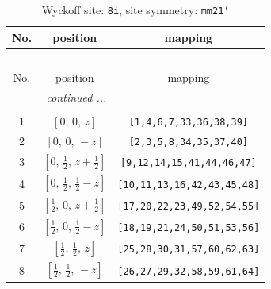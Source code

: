 \documentclass[fleqn,8pt]{jsarticle}
\begin{document}
\begin{longtable}{ccc}
\caption{Wyckoff site: {\tt 8i}, site symmetry: {\tt mm21'}}
 \\
 \hline \hline
No. & position & mapping \\ \hline \endfirsthead

\multicolumn{2}{l}{\tablename\ \thetable{}} \\
 \hline \hline
No. & position & mapping \\ \hline \endhead

 \hline \hline
\multicolumn{2}{r}{\footnotesize\it continued ...} \\ \endfoot

 \hline \hline
\multicolumn{2}{r}{} \\ \endlastfoot

1 & $\left[ 0,\, 0,\, z \right]$ & {\tt [1,4,6,7,33,36,38,39]} \\ \hline
2 & $\left[ 0,\, 0,\, - z \right]$ & {\tt [2,3,5,8,34,35,37,40]} \\ \hline
3 & $\left[ 0,\, \frac{1}{2},\, z + \frac{1}{2} \right]$ & {\tt [9,12,14,15,41,44,46,47]} \\ \hline
4 & $\left[ 0,\, \frac{1}{2},\, \frac{1}{2} - z \right]$ & {\tt [10,11,13,16,42,43,45,48]} \\ \hline
5 & $\left[ \frac{1}{2},\, 0,\, z + \frac{1}{2} \right]$ & {\tt [17,20,22,23,49,52,54,55]} \\ \hline
6 & $\left[ \frac{1}{2},\, 0,\, \frac{1}{2} - z \right]$ & {\tt [18,19,21,24,50,51,53,56]} \\ \hline
7 & $\left[ \frac{1}{2},\, \frac{1}{2},\, z \right]$ & {\tt [25,28,30,31,57,60,62,63]} \\ \hline
8 & $\left[ \frac{1}{2},\, \frac{1}{2},\, - z \right]$ & {\tt [26,27,29,32,58,59,61,64]} \\
\end{longtable}
\renewcommand{\arraystretch}{1.2}
\end{document}
